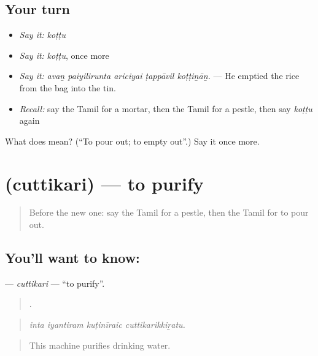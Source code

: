 \subsection*{Your turn}
\begin{itemize}
\raggedright
  \item \emph{Say it:} \emph{koṭṭu}
  \item \emph{Say it:} \emph{koṭṭu}, once more
  \item \emph{Say it:} \emph{avaṉ paiyilirunta ariciyai ṭappāvil koṭṭiṉāṉ.} — He emptied the rice from the bag into the tin.
  \item \emph{Recall:} say the Tamil for a mortar, then the Tamil for a pestle, then say \emph{koṭṭu} again
\end{itemize}

\begin{tcolorbox}[breakable,colback=teal!4,colframe=teal!35!black,title={Before you move on}]
What does  mean? (\textquotedblleft{}To pour out; to empty out\textquotedblright{}.) Say it once more.
\end{tcolorbox}
\section[\texorpdfstring{\ta{சுத்திகரி} (cuttikari)}{சுத்திகரி (cuttikari)}]{ (cuttikari) — to purify}

\label{lesson:TA-C524-cuttikari}



\begin{quote}
Before the new one: say the Tamil for a pestle, then the Tamil for to pour out.
\end{quote}

\subsection*{You'll want to know: }
\textbf{} — \emph{cuttikari} — \textquotedblleft{}to purify\textquotedblright{}.

\begin{quote}
   .
\end{quote}

\begin{quote}
\emph{inta iyantiram kuṭinīraic cuttikarikkiṟatu.}
\end{quote}

\begin{quote}
This machine purifies drinking water.
\end{quote}

